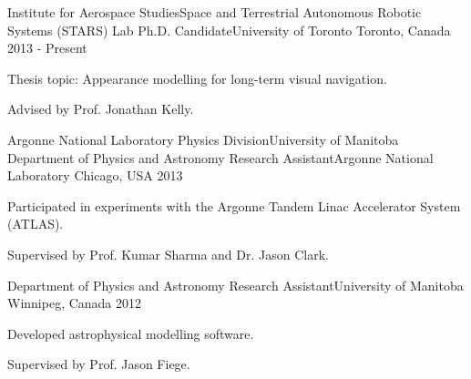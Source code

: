 

\begin{cventries}

  \cventry
    {Institute for Aerospace Studies{\enskip\cdotp\enskip}Space and Terrestrial Autonomous Robotic Systems (STARS) Lab} %
    {Ph.D. Candidate{\enskip\cdotp\enskip}University of Toronto} %
    {Toronto, Canada} %
    {2013 - Present} %
    {
      \begin{cvitems} %
        \item {Thesis topic: Appearance modelling for long-term visual navigation.}
        \item {Advised by Prof. Jonathan Kelly.}
      \end{cvitems}
    }

  \cventry
    {Argonne National Laboratory Physics Division{\enskip\cdotp\enskip}University of Manitoba Department of Physics and Astronomy} %
    {Research Assistant{\enskip\cdotp\enskip}Argonne National Laboratory} %
    {Chicago, USA} %
    {2013} %
    {
      \begin{cvitems} %
        \item {Participated in experiments with the Argonne Tandem Linac Accelerator System (ATLAS).}
        \item {Supervised by Prof. Kumar Sharma and Dr. Jason Clark.}
      \end{cvitems}
    }
  
    \cventry
    {Department of Physics and Astronomy} %
    {Research Assistant{\enskip\cdotp\enskip}University of Manitoba} %
    {Winnipeg, Canada} %
    {2012} %
    {
      \begin{cvitems} %
        \item {Developed astrophysical modelling software.}
        \item {Supervised by Prof. Jason Fiege.}
      \end{cvitems}
    }

\end{cventries}
